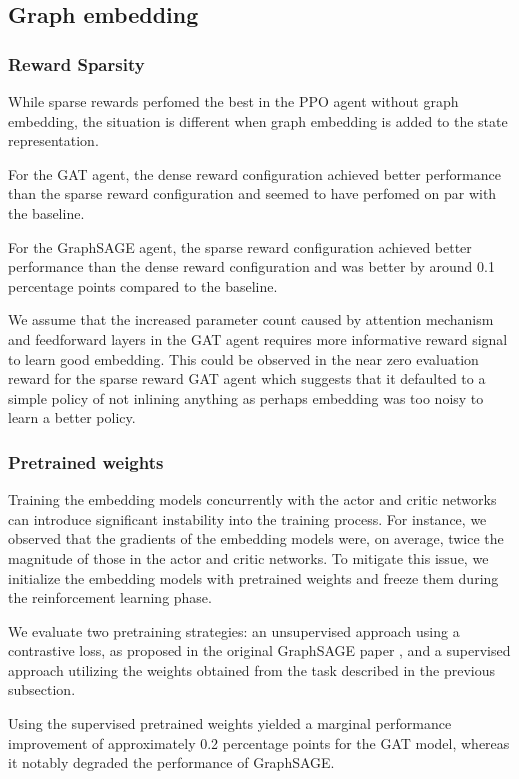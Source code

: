 \documentclass{article}
\theoremstyle{plain}
\theoremstyle{definition}
\theoremstyle{remark}
\begin{document}
\subsection{Graph embedding}

\subsubsection{Reward Sparsity}

While sparse rewards perfomed the best in the PPO agent without graph embedding, the situation is different when graph embedding is added to the state representation.

For the GAT agent, the dense reward configuration achieved better performance than the sparse reward configuration and seemed to have perfomed on par with the baseline.

For the GraphSAGE agent, the sparse reward configuration achieved better performance than the dense reward configuration and was better by around 0.1 percentage points compared to the baseline.

We assume that the increased parameter count caused by attention mechanism and feedforward layers in the GAT agent requires more informative reward signal to learn good embedding. This could be observed in the near zero evaluation reward for the sparse reward GAT agent which suggests that it defaulted to a simple policy of not inlining anything as perhaps embedding was too noisy to learn a better policy.

\subsubsection{Pretrained weights}

Training the embedding models concurrently with the actor and critic networks can introduce significant instability into the training process. For instance, we observed that the gradients of the embedding models were, on average, twice the magnitude of those in the actor and critic networks. To mitigate this issue, we initialize the embedding models with pretrained weights and freeze them during the reinforcement learning phase.

We evaluate two pretraining strategies: an unsupervised approach using a contrastive loss, as proposed in the original GraphSAGE paper \cite{sage}, and a supervised approach utilizing the weights obtained from the task described in the previous subsection.

Using the supervised pretrained weights yielded a marginal performance improvement of approximately 0.2 percentage points for the GAT model, whereas it notably degraded the performance of GraphSAGE.
\end{document}

